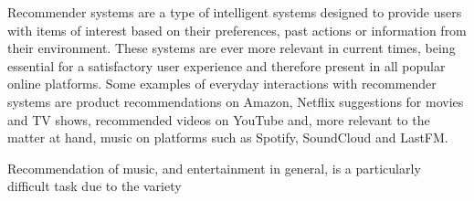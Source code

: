 Recommender systems are a type of intelligent systems designed to provide users with items of interest based on
their preferences, past actions or information from their environment. These systems are ever more relevant in
current times, being essential for a satisfactory user experience and therefore present in all popular online platforms. 
Some examples of everyday interactions with recommender systems are product recommendations on Amazon, Netflix suggestions for 
movies and TV shows, recommended videos on YouTube and, more relevant to the matter at hand, music on platforms such as Spotify,
SoundCloud and LastFM.

Recommendation of music, and entertainment in general, is a particularly difficult task due to the variety 